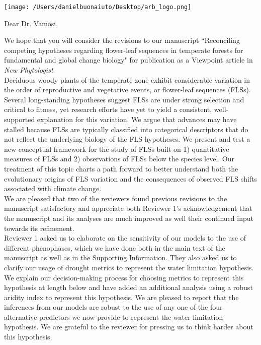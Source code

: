 \documentclass{article}[11pt]
\begin{document}

\def\labelitemi{--}
\parindent=24pt
\noindent\texttt{[image: /Users/danielbuonaiuto/Desktop/arb\_logo.png]}




\vspace{2.5ex}

\noindent Dear Dr. Vamosi,\\ 
  
  \vspace{1.5ex}

\noindent We hope that you will consider the revisions to our manuscript ``Reconciling competing hypotheses regarding flower-leaf sequences in temperate forests for fundamental and global change biology" for publication as a Viewpoint article in \emph{New Phytologist}.\\

\noindent Deciduous woody plants of the temperate zone exhibit considerable variation in the order of reproductive and vegetative events, or flower-leaf sequences (FLSs). Several long-standing hypotheses suggest FLSs are under strong selection and critical to fitness, yet research efforts have yet to yield a consistent, well-supported explanation for this variation. We argue that advances may have stalled because FLSs are typically classified into categorical descriptors that do not reflect the underlying biology of the FLS hypotheses. We present and test a new conceptual framework for the study of FLSs built on 1) quantitative measures of FLSs and 2) observations of FLSs below the species level. Our treatment of this topic charts a path forward to better understand both the evolutionary origins of FLS variation and the consequences of observed FLS shifts associated with climate change.\\

\noindent We are pleased that two of the reviewers found previous revisions to the manuscript satisfactory and appreciate both Reviewer 1's acknowledgement that the manuscript and its analyses are much improved as well their continued input towards its refinement.\\ 

\noindent Reviewer 1 asked us to elaborate on the sensitivity of our models to the use of different phenophases, which we have done both in the main text of the manuscript as well as in the Supporting Information. They also asked us to clarify our usage of drought metrics to represent the water limitation hypothesis. We explain our decision-making process for choosing metrics to represent this hypothesis at length below and have added an additional analysis using a robust aridity index to represent this hypothesis. We are pleased to report that the inferences from our models are robust to the use of any one of the four alternative predictors we now provide to represent the water limitation hypothesis. We are grateful to the reviewer for pressing us to think harder about this hypothesis.\\
\end{document}
